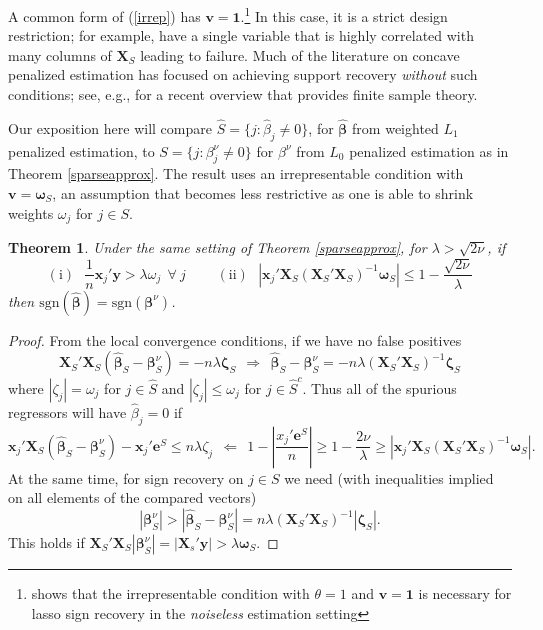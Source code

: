 \documentclass[12pt]{article}
\newtheorem{theorem}{\sc Theorem}[section]
\newcommand{\bs}[1]{\boldsymbol{#1}}
\newcommand{\mr}[1]{\mathrm{#1}}
\newcommand{\bm}[1]{\mathbf{#1}}
\begin{document}
A common form of (\ref{irrep}) has $\bm{v}=\bm{1}$.\footnote{\cite{wainwright_sharp_2009} shows that the irrepresentable condition with $\theta=1$ and $\bm{v}=\bm{1}$ is necessary for lasso sign recovery in the {\it noiseless} estimation setting} In this case, it
is a strict design restriction; for example,
\citet{buhlmann_statistics_2011} have a single variable that is
highly correlated with many columns of $\bm{X}_S$ leading to failure. Much
of the literature on concave penalized estimation has focused on achieving
support recovery {\it without} such conditions; see, e.g.,
\cite{fan_strong_2014} for a recent overview that provides finite sample
theory.  

Our exposition here will compare $\hat S = \{j: \hat\beta_j \neq 0\}$, for $\bs{\hat\beta}$ from weighted $L_1$ penalized estimation, to $S = \{j: \beta^\nu_j \neq 0\}$ for $\beta^\nu$ from $L_0$ penalized estimation as in Theorem \ref{sparseapprox}.  The result uses an irrepresentable condition with $\bm{v} = \bs{\omega}_S$, an assumption that becomes less restrictive as one is able to shrink weights $\omega_j$ for $j\in S$.

\begin{theorem}
Under the same setting of Theorem \ref{sparseapprox}, for $\lambda > \sqrt{2\nu}$, if
\begin{equation}
\mr{(i)}~~~\frac{1}{n}\bs{x}_j'\bm{y} > \lambda\omega_j ~~\forall~j 
~~~~~~~~~~\mr{(ii)}~~~|\bs{x}_j'\bm{X}_S(\bm{X}_S'\bm{X}_S)^{-1}\bs{\omega}_S| \leq 1 - \frac{\sqrt{2\nu}}{\lambda}
\end{equation}
then $\mr{sgn}(\bs{\hat\beta}) = \mr{sgn}(\bs{\beta}^\nu)$.
\end{theorem}
\begin{proof}
From the local convergence conditions, if we have no false positives
\begin{equation}
\bm{X}_S'\bm{X}_S(\bs{\hat\beta}_S-\bs{\beta}^\nu_S) = -n\lambda\bs{\zeta}_S ~~\Rightarrow~~ \bs{\hat\beta}_S-\bs{\beta}^\nu_S = -n\lambda(\bm{X}_S'\bm{X}_S)^{-1}\bs{\zeta}_S
\end{equation}
where $|\zeta_j| = \omega_j$ for $j\in\hat S$ and $|\zeta_j| \leq \omega_j$ for $j\in\hat S^c$. Thus all of the spurious regressors will have $\hat \beta_j = 0$
if 
\begin{equation}
\bs{x}_j'\bm{X}_S(\bs{\hat\beta}_S-\bs{\beta}^\nu_S) - \bs{x}_j'\bm{e}^S 
\leq n\lambda\zeta_j ~~\Leftarrow~~
1 - \left|\frac{x_j'\bm{e}^S}{n}\right| \geq 1 - \frac{2\nu}{\lambda} \geq |\bs{x}_j'\bm{X}_S(\bm{X}_S'\bm{X}_S)^{-1}\bs{\omega}_S|.
\end{equation}
At the same time, for sign recovery on $j\in S$ we need (with inequalities implied on all elements of the compared vectors)
\begin{equation}
|\bs{\beta}_S^\nu| > |\bs{\hat\beta}_S - \bs{\beta}^\nu_S| = n\lambda (\bm{X}_S'\bm{X}_S)^{-1}|\bs{\zeta}_S|.
\end{equation}
This holds if $\bm{X}_S'\bm{X}_S|\bs{\beta}^\nu_S| = |\bm{X}_s'\bm{y}| > \lambda\bs{\omega}_S$.

\end{proof}
\end{document}
